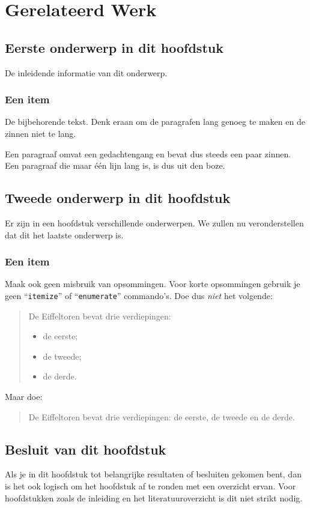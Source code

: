 \chapter{Gerelateerd Werk}
\label{hoofdstuk:related}


\section{Eerste onderwerp in dit hoofdstuk}
De inleidende informatie van dit onderwerp.

\subsection{Een item}
De bijbehorende tekst. Denk eraan om de paragrafen lang genoeg te maken en
de zinnen niet te lang.

Een paragraaf omvat een gedachtengang en bevat dus steeds een paar zinnen.
Een paragraaf die maar \'e\'en lijn lang is, is dus uit den boze.

\section{Tweede onderwerp in dit hoofdstuk}
Er zijn in een hoofdstuk verschillende onderwerpen. We zullen nu
veronderstellen dat dit het laatste onderwerp is.

\subsection{Een item}
Maak ook geen misbruik van opsommingen. Voor korte opsommingen gebruik je
geen ``\verb|itemize|'' of ``\texttt{enumerate}'' commando's. Doe dus
\emph{niet} het volgende:
\begin{quote}
  De Eiffeltoren bevat drie verdiepingen:
  \begin{itemize}
  \item de eerste;
  \item de tweede;
  \item de derde.
  \end{itemize}
\end{quote}
Maar doe:
\begin{quote}
  De Eiffeltoren bevat drie verdiepingen: de eerste, de tweede en de derde.
\end{quote}

\section{Besluit van dit hoofdstuk}
Als je in dit hoofdstuk tot belangrijke resultaten of besluiten gekomen
bent, dan is het ook logisch om het hoofdstuk af te ronden met een
overzicht ervan. Voor hoofdstukken zoals de inleiding en het
literatuuroverzicht is dit niet strikt nodig.

